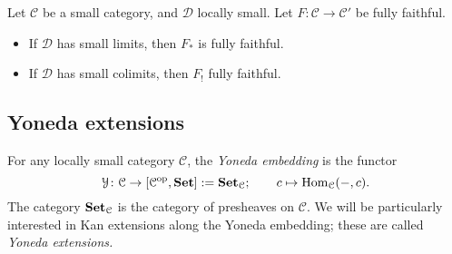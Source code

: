 \documentclass[main.tex]{subfiles}
\begin{document}
\begin{corollary}
  Let $\mathcal{C}$ be a small category, and $\mathcal{D}$ locally small. Let $F\colon \mathcal{C} \to \mathcal{C'}$ be fully faithful.
  \begin{itemize}
    \item If $\mathcal{D}$ has small limits, then $F_{*}$ is fully faithful.

    \item If $\mathcal{D}$ has small colimits, then $F_{!}$ fully faithful.
  \end{itemize}
\end{corollary}


\subsection{Yoneda extensions}
\label{ssc:yoneda_extensions}

For any locally small category $\mathcal{C}$, the \emph{Yoneda embedding} is the functor
\begin{equation*}
  \mathcal{Y}\colon \mathcal{C} \to [\mathcal{C}^{\mathrm{op}}, \mathbf{Set}] := \mathbf{Set}_{\mathcal{C}};\qquad c \mapsto \operatorname{Hom}_{\mathcal{C}}(-, c).
\end{equation*}
The category $\mathbf{Set}_{\mathcal{C}}$ is the category of presheaves on $\mathcal{C}$. We will be particularly interested in Kan extensions along the Yoneda embedding; these are called \emph{Yoneda extensions.}

\end{document}
